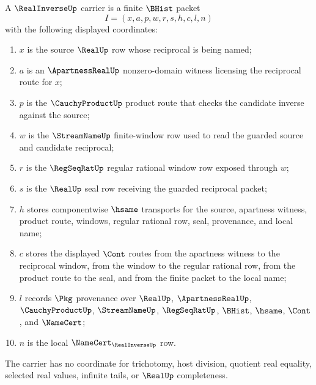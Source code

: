 \begin{definition}
\label{def:real-inverse-carrier}
A $\RealInverseUp$ carrier is a finite $\BHist$ packet
$$
I=(x,a,p,w,r,s,h,c,l,n)
$$
with the following displayed coordinates:
\begin{enumerate}
\item $x$ is the source $\RealUp$ row whose reciprocal is being named;
\item $a$ is an $\ApartnessRealUp$ nonzero-domain witness licensing the reciprocal route for $x$;
\item $p$ is the $\CauchyProductUp$ product route that checks the candidate inverse against the source;
\item $w$ is the $\StreamNameUp$ finite-window row used to read the guarded source and candidate reciprocal;
\item $r$ is the $\RegSeqRatUp$ regular rational window row exposed through $w$;
\item $s$ is the $\RealUp$ seal row receiving the guarded reciprocal packet;
\item $h$ stores componentwise $\hsame$ transports for the source, apartness witness, product route, windows, regular rational row, seal, provenance, and local name;
\item $c$ stores the displayed $\Cont$ routes from the apartness witness to the reciprocal window, from the window to the regular rational row, from the product route to the seal, and from the finite packet to the local name;
\item $l$ records $\Pkg$ provenance over $\RealUp$, $\ApartnessRealUp$, $\CauchyProductUp$, $\StreamNameUp$, $\RegSeqRatUp$, $\BHist$, $\hsame$, $\Cont$, and $\NameCert$;
\item $n$ is the local $\NameCert_{\RealInverseUp}$ row.
\end{enumerate}
The carrier has no coordinate for trichotomy, host division, quotient real equality, selected real values, infinite tails, or $\RealUp$ completeness.
\end{definition}

